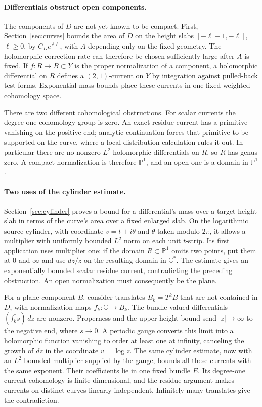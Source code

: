 \documentclass[11pt]{article}
\numberwithin{equation}{section}
\theoremstyle{definition}
\theoremstyle{remark}
\newcommand{\CC}{\mathbb C}
\newcommand{\PP}{\mathbb P}
\begin{document}
\paragraph{Differentials obstruct open components.}
The components of $D$ are not yet known to be compact. First,
Section~\ref{sec:curves} bounds the area of $D$ on the height slabs
$[-\ell-1,-\ell]$, $\ell\ge0$, by $C_D e^{A\ell}$, with $A$
depending only on the fixed geometry. The holomorphic correction rate
can therefore be chosen sufficiently large after $A$ is fixed.
If $f:R\to B\subset Y$ is
the proper normalization of a component, a holomorphic differential on
$R$ defines a $(2,1)$-current on $Y$ by integration against pulled-back
test forms. Exponential mass bounds place these currents in one fixed
weighted cohomology space.

There are two different cohomological obstructions. For scalar
currents the degree-one cohomology group is zero. An exact residue current has a
primitive vanishing on the positive end; analytic continuation forces
that primitive to be supported on the curve, where a local distribution
calculation rules it out. In particular there are no nonzero $L^2$
holomorphic differentials on $R$, so $R$ has genus zero. A compact
normalization is therefore $\PP^1$, and an open one is a domain in
$\PP^1$.

\paragraph{Two uses of the cylinder estimate.}
Section~\ref{sec:cylinder} proves a bound for a differential's mass over
a target height slab in terms of the curve's area over a fixed enlarged
slab. On the logarithmic source cylinder, with coordinate $v=t+i\theta$
and $\theta$ taken modulo $2\pi$, it allows a multiplier with uniformly
bounded $L^2$ norm on each unit $t$-strip. Its first application
uses multiplier one: if the domain $R\subset\PP^1$ omits two points,
put them at $0$ and $\infty$ and use $dz/z$ on the resulting domain in
$\CC^*$. The estimate gives an exponentially bounded scalar residue
current, contradicting the preceding obstruction. An open normalization
must consequently be the plane.

For a plane component $B$, consider translates $B_k=T^kB$ that are not
contained in $D$, with normalization maps $f_k:\CC\to B_k$. The
bundle-valued differentials $(f_k^*s)\,dz$ are nonzero. Properness and the
upper height bound send $|z|\to\infty$ to the negative end, where
$s\to0$. A periodic
gauge converts this limit into a holomorphic function vanishing to
order at least one at infinity, canceling the growth of $dz$ in the
coordinate $v=\log z$. The same cylinder estimate, now with an
$L^2$-bounded multiplier supplied by the gauge, bounds all these
currents with the same exponent. Their coefficients lie in one fixed
bundle $E$. Its degree-one current cohomology is finite dimensional,
and the residue argument makes currents on distinct curves linearly
independent. Infinitely many translates give the contradiction.
\end{document}
